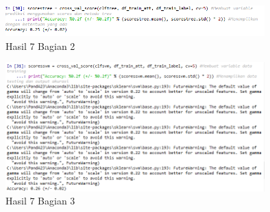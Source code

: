 
\begin{figure}[H]
\centerline{\includegraphics[width=10cm]{figures/1174087/3/32.png}}
\caption{Hasil 7 Bagian 2}
\label{labelgambar}
\end{figure}


\begin{figure}[H]
\centerline{\includegraphics[width=10cm]{figures/1174087/3/33.png}}
\caption{Hasil 7 Bagian 3}
\label{labelgambar}
\end{figure}

